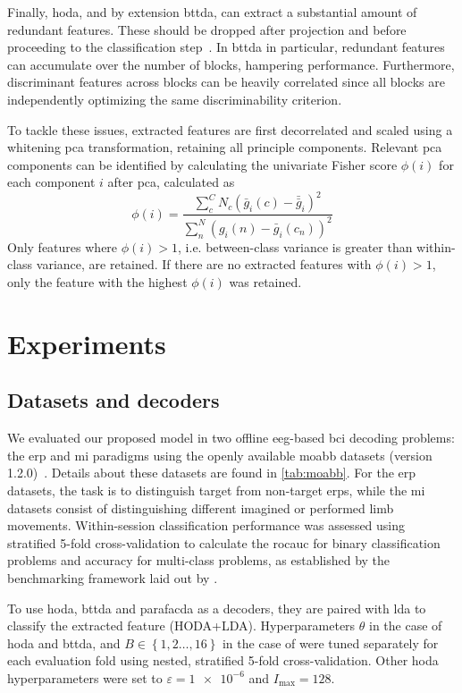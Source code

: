 \documentclass[twocolumn]{article}
\begin{document}
Finally, \ac{hoda}, and by extension \ac{bttda}, can extract a substantial amount
of redundant features.
These should be dropped after projection and before proceeding to the classification
step~\cite{Phan2010}.
In \ac{bttda} in particular, redundant features can accumulate over the number of
blocks, hampering performance.
Furthermore, discriminant features across blocks can be heavily correlated since
all blocks are independently optimizing the same discriminability criterion.

To tackle these issues, extracted features are first decorrelated and scaled using
a whitening \ac{pca} transformation, retaining all principle components.
Relevant \ac{pca} components can be identified by calculating the
univariate Fisher score $\phi(i)$ for each component $i$ after \ac{pca},
calculated as
\begin{equation}
	\phi(i) = \frac
	{\sum_c^C N_c \left(\bar{g}_i(c)-\bar{\bar{g}}_i\right)^2}
	{\sum_n^N \left(g_i(n)-\bar{g}_i(c_n)\right)^2}
\end{equation}
Only features where $\phi(i) > 1$, i.e. between-class variance is greater
than within-class variance, are retained.
If there  are no extracted features with $\phi(i) > 1$, only the feature with the highest
$\phi(i)$ was retained.

\section{Experiments}
\subsection{Datasets and decoders}
We evaluated our proposed model in two offline \ac{eeg}-based \ac{bci} decoding problems:
the \acf{erp} and \acf{mi} paradigms using the openly available \ac{moabb} datasets
(version 1.2.0)~\cite{Aristimunha2023}.
Details about these datasets are found in \cref{tab:moabb}.
For the \ac{erp} datasets, the task is to distinguish target from non-target \acp{erp},
while the \ac{mi} datasets consist of distinguishing different imagined or performed
limb movements.
Within-session classification performance was assessed using stratified 5-fold
cross-validation to calculate the \ac{rocauc} for binary classification problems and accuracy
for multi-class problems, as established by the benchmarking framework laid out
by \textcite{Aristimunha2023}.

To use \ac{hoda}, \ac{bttda} and \ac{parafacda} as a decoders, they are paired with \ac{lda} to classify the
extracted feature (HODA+LDA).
Hyperparameters $\theta$ in the case of \ac{hoda} and \ac{bttda}, and $B \in
	\left\{1,2\ldots,16\right\}$ in the case of were tuned separately for each
evaluation fold using nested, stratified 5-fold cross-validation.
Other \ac{hoda} hyperparameters were set to $\varepsilon=\num{1e-6}$ and $I_\text{max}=128$.
\end{document}

